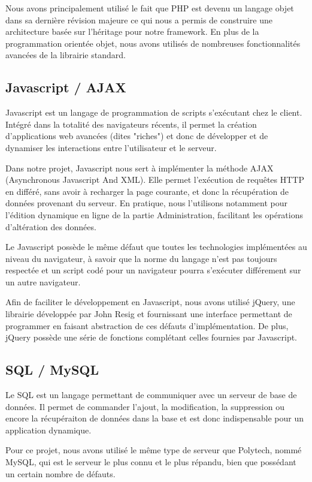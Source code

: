 Nous avons principalement utilisé le fait que PHP est devenu un langage objet dans 
sa dernière révision majeure ce qui nous a permis de construire une architecture
basée sur l'héritage pour notre framework. En plus de la programmation orientée
objet, nous avons utilisés de nombreuses fonctionnalités avancées de la librairie 
standard.


        \subsection{Javascript / AJAX}
Javascript est un langage de programmation de scripts s'exécutant chez le client.
Intégré dans la totalité des navigateurs récents, il permet la création d'applications 
web avancées (dites "riches") et donc de développer et de dynamiser les interactions
entre l'utilisateur et le serveur.

Dans notre projet, Javascript nous sert à implémenter la méthode AJAX (Asynchronous 
Javascript And XML). Elle permet l'exécution de requêtes HTTP en différé, sans 
avoir à recharger la page courante, et donc la récupération de données provenant du 
serveur. En pratique, nous l'utilisons notamment pour l'édition dynamique en ligne 
de la partie Administration, facilitant les opérations d'altération des données.

Le Javascript possède le même défaut que toutes les technologies implémentées au
niveau du navigateur, à savoir que la norme du langage n'est pas toujours respectée 
et un script codé pour un navigateur pourra s'exécuter différement sur un autre
navigateur.

Afin de faciliter le développement en Javascript, nous avons utilisé jQuery, une 
librairie développée par John Resig et fournissant une interface permettant de 
programmer en faisant abstraction de ces défauts d'implémentation. De plus, jQuery 
possède une série de fonctions complétant celles fournies par Javascript.


        \subsection{SQL / MySQL}
Le SQL est un langage permettant de communiquer avec un serveur de base de données. 
Il permet de commander l'ajout, la modification, la suppression ou encore la 
récupéraiton de données dans la base et est donc indispensable pour un application 
dynamique.

Pour ce projet, nous avons utilisé le même type de serveur que Polytech, nommé
MySQL, qui est le serveur le plus connu et le plus répandu, bien que possédant 
un certain nombre de défauts.


